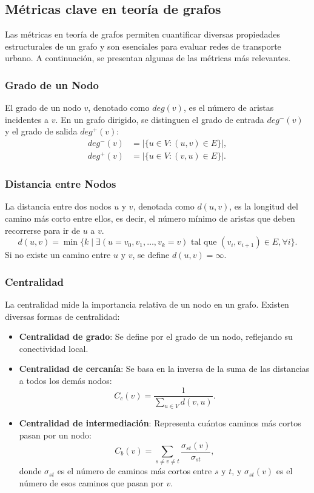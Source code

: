 \documentclass[openany]{book}
\begin{document}
		
		\subsection{Métricas clave en teoría de grafos}
		
			Las métricas en teoría de grafos permiten cuantificar diversas propiedades estructurales de un grafo y son esenciales para evaluar redes de transporte urbano. A continuación, se presentan algunas de las métricas más relevantes.
			
			\subsubsection{Grado de un Nodo}
			El grado de un nodo $v$, denotado como $deg(v)$, es el número de aristas incidentes a $v$. En un grafo dirigido, se distinguen el grado de entrada $deg^-(v)$ y el grado de salida $deg^+(v)$:
			\begin{align}
				deg^-(v) &= |\{ u \in V : (u,v) \in E \}|, \\
				deg^+(v) &= |\{ u \in V : (v,u) \in E \}|.
			\end{align}
			
			\subsubsection{Distancia entre Nodos}
			La distancia entre dos nodos $u$ y $v$, denotada como $d(u,v)$, es la longitud del camino más corto entre ellos, es decir, el número mínimo de aristas que deben recorrerse para ir de $u$ a $v$.
			\begin{equation}
				d(u,v) = \min \{ k \mid \exists (u = v_0, v_1, \dots, v_k = v) \text{ tal que } (v_i, v_{i+1}) \in E, \forall i \}.
			\end{equation}
			Si no existe un camino entre $u$ y $v$, se define $d(u,v) = \infty$.
			
			\subsubsection{Centralidad}
			La centralidad mide la importancia relativa de un nodo en un grafo. Existen diversas formas de centralidad:
			\begin{itemize}
				\item \textbf{Centralidad de grado}: Se define por el grado de un nodo, reflejando su conectividad local.
				\item \textbf{Centralidad de cercanía}: Se basa en la inversa de la suma de las distancias a todos los demás nodos:
				\begin{equation}
					C_c(v) = \frac{1}{\sum_{u \in V} d(v,u)}.
				\end{equation}
				\item \textbf{Centralidad de intermediación}: Representa cuántos caminos más cortos pasan por un nodo:
				\begin{equation}
					C_b(v) = \sum_{s \neq v \neq t} \frac{\sigma_{st}(v)}{\sigma_{st}},
				\end{equation}
				donde $\sigma_{st}$ es el número de caminos más cortos entre $s$ y $t$, y $\sigma_{st}(v)$ es el número de esos caminos que pasan por $v$.
			\end{itemize}
			
\end{document}
